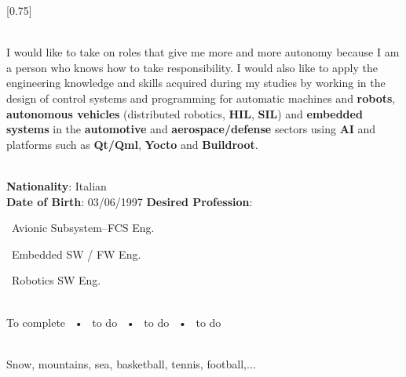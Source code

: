 \documentclass[lighthipster]{simplehipstercv}
\begin{document}
    \setlength{\columnsep}{1.5cm}
    [0.75]
    \begin{paracol}{2}
    
    \paracolbackgroundoptions
    
    
    
    \footnotesize
    {
    \setasidefontcolour
    \flushright
    \begin{center}
    \end{center}
    
    \\[0.5em]
        {\footnotesize 
        I would like to take on roles that give me more and more autonomy because I am a person who knows how to take
        responsibility. I would also like to apply the engineering
        knowledge and skills acquired during my studies by working in the
        design of control systems and programming for automatic
        machines and \textbf{robots}, \textbf{autonomous vehicles} (distributed robotics,
        \textbf{HIL}, \textbf{SIL}) and \textbf{embedded systems} in the \textbf{automotive} and
        \textbf{aerospace/defense} sectors using \textbf{AI} and platforms such as \textbf{Qt/Qml},
        \textbf{Yocto} and \textbf{Buildroot}.
        }
    
    \bigskip
    
     \\[0.5em]
    \textbf{Nationality}: Italian \\
    \textbf{Date of Birth}: 03/06/1997
    \textbf{Desired Profession}: \par \textbullet\ Avionic Subsystem--FCS Eng. \par 
    \textbullet\ Embedded SW / FW Eng. \par
    \textbullet\ Robotics SW Eng.
    
    \bigskip
    
     \\[0.5em]
    To complete ~•~ to do ~•~ to do ~•~ to do
    
    \bigskip
    
    \bigskip
    
    \\[0.5em]
    Snow, mountains, sea, basketball, tennis, football,...
    \bigskip
    
}
\end{paracol}
\end{document}

